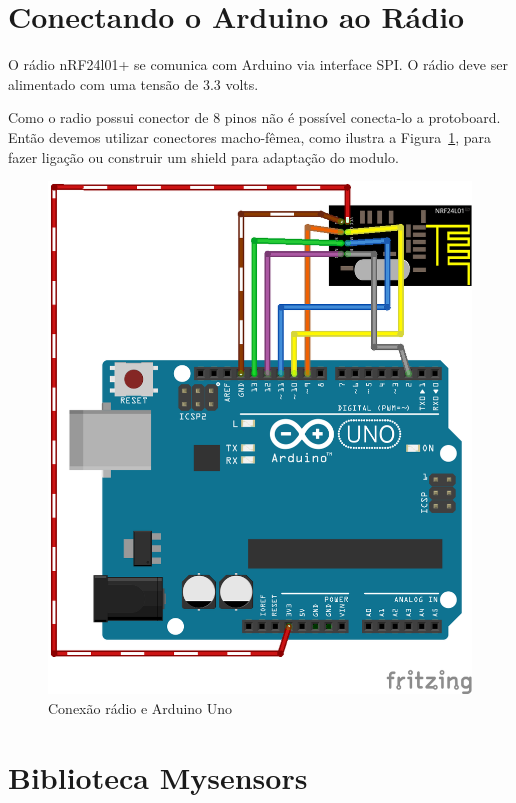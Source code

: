 
\section{Conectando o Arduino ao Rádio}

O rádio nRF24l01+ se comunica com Arduino via interface SPI. O rádio deve ser alimentado com uma tensão de 3.3 volts. 

Como o radio possui conector de 8 pinos não é possível conecta-lo a protoboard. Então devemos utilizar conectores macho-fêmea, como ilustra a Figura~\ref{fig:gat}, para fazer ligação ou construir um shield para adaptação do modulo.

\begin{figure}[H]
      \centering
      \includegraphics[scale=0.50]{figuras/gateway.png}
      \caption{Conexão rádio e Arduino Uno}
      \label{fig:gat}
\end{figure}

\section{Biblioteca Mysensors}

